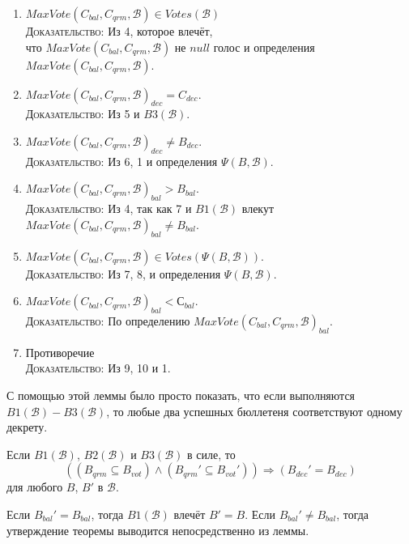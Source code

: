 \documentclass[12pt, a4paper]{article} %
\begin{document}
\begin{lemmaproof}
\begin{enumerate}
    \item $MaxVote(C_{bal}, C_{qrm}, \mathcal{B}) \in Votes(\mathcal{B})$\\
          \textsc{Доказательство}: Из 4, которое влечёт,\\ 
          что $MaxVote(C_{bal}, C_{qrm}, \mathcal{B})$ не $null$ голос и определения  $MaxVote(C_{bal}, C_{qrm}, \mathcal{B})$.

    \item $MaxVote(C_{bal}, C_{qrm}, \mathcal{B})_{dec} = C_{dec}$.\\
          \textsc{Доказательство}: Из 5 и $B3(\mathcal{B})$.

    \item $MaxVote(C_{bal}, C_{qrm}, \mathcal{B})_{dec} \neq B_{dec}$.\\
          \textsc{Доказательство}: Из 6, 1 и определения $\Psi(B, \mathcal{B})$.

    \item $MaxVote(C_{bal}, C_{qrm}, \mathcal{B})_{bal} > B_{bal}$.\\
          \textsc{Доказательство}: Из 4, так как 7 и $B1(\mathcal{B})$ влекут \\
          $MaxVote(C_{bal}, C_{qrm}, \mathcal{B})_{bal} \neq B_{bal}$.

    \item $MaxVote(C_{bal}, C_{qrm}, \mathcal{B}) \in Votes(\Psi(B, \mathcal{B}))$.\\
          \textsc{Доказательство}: Из 7, 8, и определения $\Psi(B, \mathcal{B})$.

    \item $MaxVote(C_{bal}, C_{qrm}, \mathcal{B})_{bal} < С_{bal}$.\\
          \textsc{Доказательство}: По определению $MaxVote(C_{bal}, C_{qrm}, \mathcal{B})_{bal}$.
    
    \item Противоречие\\
          \textsc{Доказательство}: Из 9, 10 и 1.
\end{enumerate}
\end{lemmaproof}

С помощью этой леммы было просто показать, что если выполняются $B1(\mathcal{B}) - B3(\mathcal{B})$, то любые два успешных бюллетеня соответствуют одному декрету.
\begin{theorem}
Если $B1(\mathcal{B})$, $B2(\mathcal{B})$ и $B3(\mathcal{B})$ в силе, то
\[
    ((B_{qrm} \subseteq B_{vot}) \land (B_{qrm}' \subseteq B_{vot}')) \Rightarrow (B_{dec}' = B_{dec})
\]
для любого $B$, $B'$ в $\mathcal{B}$.
\end{theorem}
\begin{theoremproof}
Если $B_{bal}' = B_{bal}$, тогда $B1(\mathcal{B})$ влечёт $B' = B$. Если $B_{bal}' \neq B_{bal}$, тогда утверждение теоремы выводится непосредственно из леммы.
\end{theoremproof}
\end{document}
